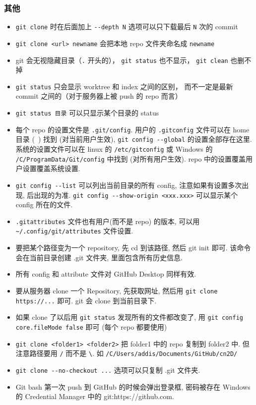 \subsubsection{其他}
\begin{itemize}
\item \verb|git clone| 时在后面加上 \verb|--depth N| 选项可以只下载最后 \verb|N| 次的 commit
\item \verb|git clone <url> newname| 会把本地 repo 文件夹命名成 \verb|newname|
\item git 会无视隐藏目录（\verb|.| 开头的）， \verb|git status| 也不显示， \verb|git clean| 也删不掉
\item \verb|git status| 只会显示 worktree 和 index 之间的区别， 而不一定是最新 commit 之间的（对于服务器上被 push 的 repo 而言）
\item \verb|git status 目录| 可以只显示某个目录的 status
\item 每个 repo 的设置文件是 \verb|.git/config|. 用户的 \verb|.gitconfig| 文件可以在 home 目录 (~) 找到 (对当前用户生效), \verb|git config --global| 的设置全部存在这里. 系统的设置文件可以在 linux 的 \verb|/etc/gitconfig| 或 Windows 的 \verb|/C/ProgramData/Git/config| 中找到 (对所有用户生效). repo 中的设置覆盖用户设置覆盖系统设置.
\item \verb|git config --list| 可以列出当前目录的所有 config, 注意如果有设置多次出现, 后出现的为准. \verb|git config --show-origin <xxx.xxx>| 可以显示某个 config 所在的文件.
\item \verb|.gitattributes| 文件也有用户(而不是 repo) 的版本, 可以用 \verb|~/.config/git/attributes| 文件设置.
\item 要把某个路径变为一个 repository, 先 cd 到该路径, 然后 git init 即可. 该命令会在当前目录创建 .git 文件夹, 里面包含所有历史信息.
\item 所有 config 和 attribute 文件对 GitHub Desktop 同样有效.
\item 要从服务器 clone 一个 Repository, 先获取网址, 然后用 \verb|git clone https://...| 即可. git 会 clone 到当前目录下.
\item 如果 clone 了以后用 \verb|git status| 发现所有的文件都改变了, 用 \verb|git config core.fileMode false| 即可 (每个 repo 都要使用)
\item \verb|git clone <folder1> <folder2>| 把 folder1 中的 repo 复制到 folder2 中. 但注意路径要用 \verb|/| 而不是 \verb|\|. 如 \verb|/C/Users/addis/Documents/GitHub/cn2D/|
\item \verb|git clone --no-checkout ...| 选项可以只复制 .git 文件夹.
\item Git bash 第一次 push 到 GitHub 的时候会弹出登录框, 密码被存在 Windows 的 Credential Manager 中的 git:https://github.com.

\end{itemize}
